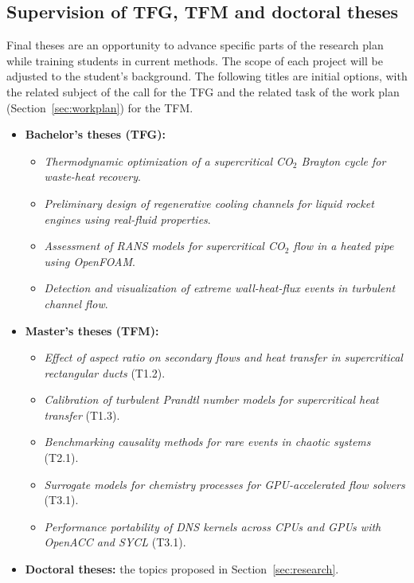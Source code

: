 \documentclass[11pt]{article}
\begin{document}
\subsection{Supervision of TFG, TFM and doctoral theses}\label{sec:theses}
Final theses are an opportunity to advance specific parts of the research plan while training students in current methods. 
The scope of each project will be adjusted to the
student's background. 
The following titles are initial options, with the related subject of the call for the TFG and the related task of the work plan (Section~\ref{sec:workplan}) for the TFM.
\begin{itemize}
  \item \textbf{Bachelor's theses (TFG):}
  \begin{itemize}
    \item \emph{Thermodynamic optimization of a supercritical CO$_2$ Brayton cycle for waste-heat recovery}.
    \item \emph{Preliminary design of regenerative cooling channels for liquid rocket engines using real-fluid properties}.
    \item \emph{Assessment of RANS models for supercritical CO$_2$ flow in a heated pipe using OpenFOAM}.
    \item \emph{Detection and visualization of extreme wall-heat-flux events in turbulent channel flow}.
  \end{itemize}
  \item \textbf{Master's theses (TFM):}
  \begin{itemize}
    \item \emph{Effect of aspect ratio on secondary flows and heat transfer in supercritical rectangular ducts} (T1.2).
    \item \emph{Calibration of turbulent Prandtl number models for supercritical heat transfer} (T1.3).
    \item \emph{Benchmarking causality methods for rare events in chaotic systems} (T2.1).
    \item \emph{Surrogate models for chemistry processes for GPU-accelerated flow solvers} (T3.1).
    \item \emph{Performance portability of DNS kernels across CPUs and GPUs with OpenACC and SYCL} (T3.1).
  \end{itemize}
  \item \textbf{Doctoral theses:} the topics proposed in Section~\ref{sec:research}.
\end{itemize}

\end{document}
